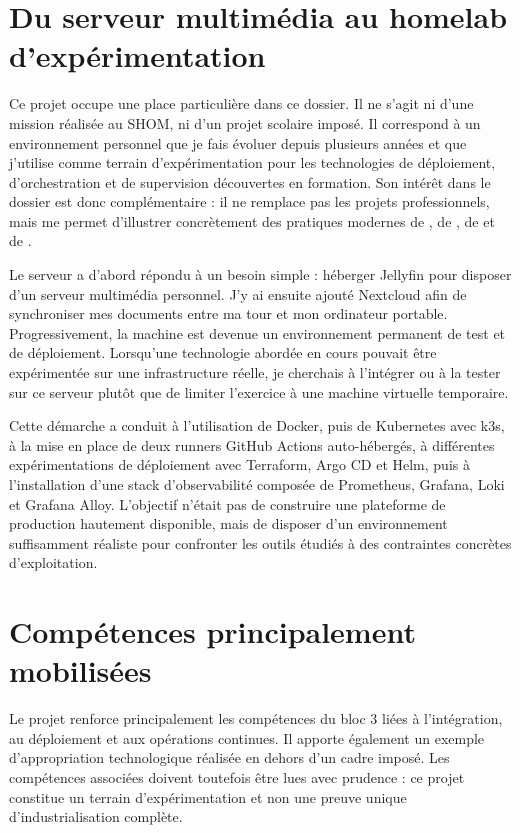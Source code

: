 \section{Du serveur multimédia au homelab d'expérimentation}

Ce projet occupe une place particulière dans ce dossier. Il ne s'agit ni d'une mission réalisée au SHOM, ni d'un projet scolaire imposé. Il correspond à un environnement personnel que je fais évoluer depuis plusieurs années et que j'utilise comme terrain d'expérimentation pour les technologies de déploiement, d'orchestration et de supervision découvertes en formation. Son intérêt dans le dossier est donc complémentaire : il ne remplace pas les projets professionnels, mais me permet d'illustrer concrètement des pratiques modernes de , de , de  et de .

Le serveur a d'abord répondu à un besoin simple : héberger Jellyfin pour disposer d'un serveur multimédia personnel. J'y ai ensuite ajouté Nextcloud afin de synchroniser mes documents entre ma tour et mon ordinateur portable. Progressivement, la machine est devenue un environnement permanent de test et de déploiement. Lorsqu'une technologie abordée en cours pouvait être expérimentée sur une infrastructure réelle, je cherchais à l'intégrer ou à la tester sur ce serveur plutôt que de limiter l'exercice à une machine virtuelle temporaire.

Cette démarche a conduit à l'utilisation de Docker, puis de Kubernetes avec k3s, à la mise en place de deux runners GitHub Actions auto-hébergés, à différentes expérimentations de déploiement avec Terraform, Argo CD et Helm, puis à l'installation d'une stack d'observabilité composée de Prometheus, Grafana, Loki et Grafana Alloy. L'objectif n'était pas de construire une plateforme de production hautement disponible, mais de disposer d'un environnement suffisamment réaliste pour confronter les outils étudiés à des contraintes concrètes d'exploitation.

\section{Compétences principalement mobilisées}

Le projet renforce principalement les compétences du bloc 3 liées à l'intégration, au déploiement et aux opérations continues. Il apporte également un exemple d'appropriation technologique réalisée en dehors d'un cadre imposé. Les compétences associées doivent toutefois être lues avec prudence : ce projet constitue un terrain d'expérimentation et non une preuve unique d'industrialisation complète.

